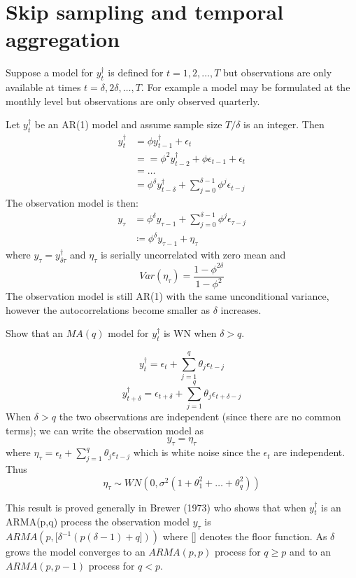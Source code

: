 \documentclass[DIV=14,titlepage=false]{scrreprt}
\begin{document}
\section{Skip sampling and temporal aggregation}
Suppose a model for $y_t^{\dagger}$ is defined for $t = 1,2,\dots, T$ but observations are only available at times $t = \delta, 2\delta, \dots, T$. For example a model may be formulated at the monthly level but observations are only observed quarterly.
\begin{example}
Let $y^\dagger_t$ be an AR(1) model and assume sample size $T/\delta$ is an integer. Then 
\begin{align*}
    y^\dagger_t &= \phi y^\dagger_{t-1} + \epsilon_t \\
    &= = \phi^2 y^\dagger_{t-2} + \phi \epsilon_{t-1} + \epsilon_t \\
    &= \dots \\
    &= \phi^\delta y^\dagger_{t-\delta} + \sum_{j=0}^{\delta-1} \phi^j \epsilon_{t-j}
\end{align*}
The observation model is then:
\begin{align*}
    y_\tau &= \phi^\delta y_{\tau-1} + \sum_{j=0}^{\delta-1} \phi^j \epsilon_{\tau-j}\\
    &\coloneq \phi^\delta y_{\tau-1} + \eta_\tau
\end{align*}
where $y_\tau = y_{\delta \tau}^\dagger$ and $\eta_\tau$ is serially uncorrelated with zero mean and 
\[
    Var(\eta_\tau) = \frac{1-\phi^{2\delta}}{1-\phi^2} 
\]
The observation model is still AR(1) with the same unconditional variance, however the autocorrelations become smaller as $\delta$ increases. 
\end{example}
\begin{question}
    Show that an $MA(q)$ model for $y_t^\dagger$ is WN when $\delta > q$.
\end{question}
\begin{solution}
\[
  y_t^\dagger = \epsilon_t + \sum_{j=1}^{q} \theta_j \epsilon_{t-j} \]
  \[y_{t+\delta}^\dagger = \epsilon_{t+\delta} + \sum_{j=1}^{q} \theta_j \epsilon_{t+\delta-j}\]
When $\delta > q$ the two observations are independent (since there are no common terms); we can write the observation model as
\[
    y_\tau = \eta_\tau 
\]
where $\eta_\tau = \epsilon_t + \sum_{j=1}^{q} \theta_j \epsilon_{t-j}$ which is white noise since the $\epsilon_t$ are independent. Thus
\[
    \eta_\tau \sim WN(0, \sigma^2(1+\theta_1^2 + \dots + \theta_q^2))
\]
\begin{note}
    This result is proved generally in Brewer (1973) who shows that when $y_t^\dagger$ is an ARMA(p,q) process the observation model $y_\tau$ is $ARMA(p, [\delta^{-1}(p(\delta -1) + q]))$ where [] denotes the floor function. As 
    $\delta$ grows the model converges to an $ARMA(p,p)$ process for $q \geq p$ and to an $ARMA(p,p-1)$ process for $q < p$.
\end{note}
\end{solution}
\end{document}
